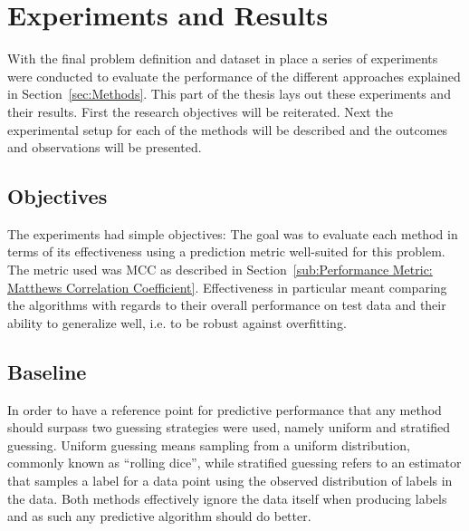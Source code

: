 
\thispagestyle{empty}

\section{Experiments and Results}
\label{sec:Experiments and Results}

With the final problem definition and dataset in place a series of experiments were conducted to evaluate the performance of the different approaches explained in Section~\ref{sec:Methods}.
This part of the thesis lays out these experiments and their results. First the research objectives will be reiterated. Next the experimental setup for each of the methods will be described and the outcomes and observations will be presented.

\subsection{Objectives}
\label{sub:Objectives}

The experiments had simple objectives: The goal was to evaluate each method in terms of its effectiveness using a prediction metric well-suited for this problem. The metric used was \gls{MCC} as described in Section~\ref{sub:Performance Metric: Matthews Correlation Coefficient}. Effectiveness in particular meant comparing the algorithms with regards to their overall performance on test data and their ability to generalize well, i.e. to be robust against overfitting.


\subsection{Baseline}
\label{sub:Baseline}

In order to have a reference point for predictive performance that any method should surpass two guessing strategies were used, namely uniform and stratified guessing. Uniform guessing means sampling from a uniform distribution, commonly known as ``rolling dice'', while stratified guessing refers to an estimator that samples a label for a data point using the observed distribution of labels in the data. Both methods effectively ignore the data itself when producing labels and as such any predictive algorithm should do better.

